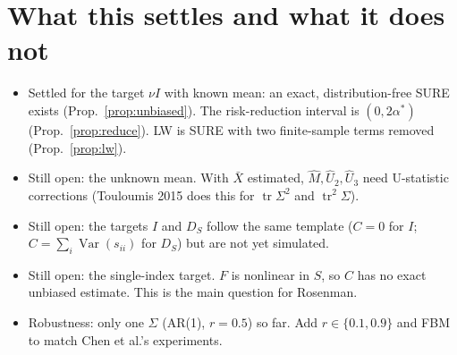 \documentclass[11pt]{article}
\theoremstyle{remark}\newtheorem*{remark}{Remark}
\newcommand{\Var}{\operatorname{Var}}
\newcommand{\tr}{\operatorname{tr}}
\begin{document}
\section{What this settles and what it does not}
\begin{itemize}
\item Settled for the target $\nu I$ with known mean: an exact, distribution-free SURE exists
(Prop.~\ref{prop:unbiased}). The risk-reduction interval is $(0,2\alpha^*)$ (Prop.~\ref{prop:reduce}).
LW is SURE with two finite-sample terms removed (Prop.~\ref{prop:lw}).
\item Still open: the unknown mean. With $\bar X$ estimated, $\hat M,\hat U_2,\hat U_3$ need
U-statistic corrections (Touloumis 2015 does this for $\tr\Sigma^2$ and $\tr^2\Sigma$).
\item Still open: the targets $I$ and $D_S$ follow the same template ($C=0$ for $I$;
$C=\sum_i\Var(s_{ii})$ for $D_S$) but are not yet simulated.
\item Still open: the single-index target. $F$ is nonlinear in $S$, so $C$ has no exact unbiased
estimate. This is the main question for Rosenman.
\item Robustness: only one $\Sigma$ (AR(1), $r=0.5$) so far. Add $r\in\{0.1,0.9\}$ and FBM to match
Chen et al.'s experiments.
\end{itemize}
\end{document}
